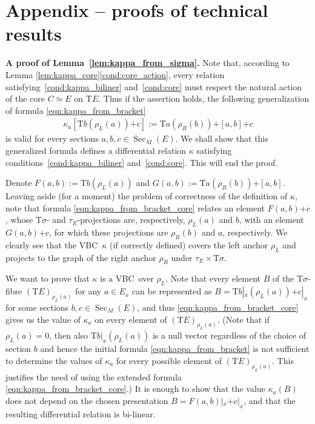 \documentclass[10pt,a4paper]{amsart}
\newcommand{\ZM}{{VBC}} %
\newcommand{\Sec}{\operatorname{Sec}}
\newcommand{\plus}{\boldsymbol{\pmb{+}}}
\newcommand{\rhoL}{\rho_L} %
\newcommand{\rhoR}{\rho_R}
\newcommand{\T}{\mathrm{T}} %
\numberwithin{equation}{section}
\theoremstyle{definition}
\begin{document}
\appendix

\section{Appendix -- proofs of technical results}\label{sec:app}

{\bf A proof of Lemma~\ref{lem:kappa_from_sigma}.} %
Note that, according to Lemma \ref{lem:kappa_core}\eqref{cond:core_action}, every relation satisfying~\eqref{cond:kappa_biliner} and~\eqref{cond:core} must respect the natural action of the core $C\simeq E$ on $\T E$. Thus if the assertion holds, the following generalization of formula \eqref{eqn:kappa_from_bracket}
\begin{gather}\label{eqn:kappa_from_bracket_core}
\kappa_a\left[\T b(\rhoL(a))\plus c\right]:=\T a(\rhoR(b))\plus [a,b]\plus c
\end{gather}
is valid for every sections $a,b,c\in\Sec_M(E)$. We shall show that this generalized formula defines a differential relation $\kappa$ satisfying conditions~\eqref{cond:kappa_biliner} and~\eqref{cond:core}. This will end the proof.

Denote $F(a,b):=\T b(\rhoL(a))$ and $G(a,b):=\T a(\rhoR(b))\plus [a,b]$. Leaving aside (for a moment) the problem of correctness of the definition of $\kappa$, note that formula \eqref{eqn:kappa_from_bracket_core} relates an element $F(a,b)\plus c$, whose $\T\sigma$- and $\tau_E$-projections are, respectively, $\rhoL(a)$ and $b$, with an element $G(a,b)\plus c$, for which these projections are $\rhoR(b)$ and $a$, respectively. We clearly see that the \ZM\ $\kappa$ (if correctly defined) covers the left anchor $\rhoL$ and projects to the graph of the right anchor $\rhoR$ under $\tau_E\times\T\sigma$.

We want to prove that $\kappa$ is a \ZM\ over $\rhoL$. Note that every element $B$ of the $\T\sigma$-fibre $(\T E)_{\rhoL(a)}$ for any $a\in E_x$ can be represented as $B=\T b|_x(\rhoL(a))\plus c|_x$ for some sections $b,c\in \Sec_M(E)$, and thus \eqref{eqn:kappa_from_bracket_core} gives us the value of $\kappa_a$ on every element of $(\T E)_{\rhoL(a)}$. (Note that if $\rhoL(a)=0$, then also $\T b|_x(\rhoL(a))$ is a null vector regardless of the choice of section $b$ and hence the initial formula \eqref{eqn:kappa_from_bracket} is not sufficient to determine the values of $\kappa_a$ for every possible element of $(\T E)_{\rhoL(a)}$. This justifies the need of using the extended formula \eqref{eqn:kappa_from_bracket_core}.) It is enough to show that the value $\kappa_a(B)$ does not depend on the chosen presentation $B=F(a,b)|_x\plus c|_x${,} and that the resulting differential relation is bi-linear.
\end{document}

